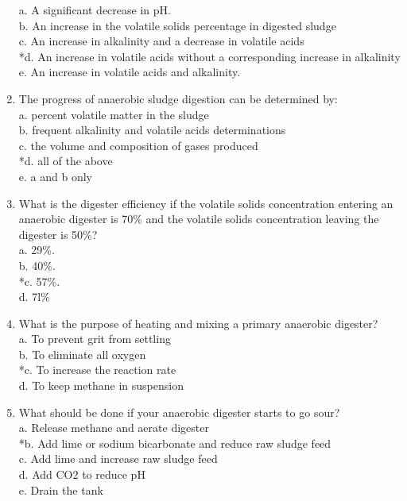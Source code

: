 \documentclass{article}
\begin{document}
\begin{enumerate}
a. A significant decrease in pH. \\
b. An increase in the volatile solids percentage in digested sludge \\
c. An increase in alkalinity and a decrease in volatile acids \\
*d. An increase in volatile acids without a corresponding increase in alkalinity \\
e. An increase in volatile acids and alkalinity. \\

\item  The progress of anaerobic sludge digestion can be determined by: \\

a. percent volatile matter in the sludge \\
b. frequent alkalinity and volatile acids determinations \\
c. the volume and composition of gases produced \\
*d. all of the above \\
e. a and b only \\

\item  What is the digester efficiency if the volatile solids concentration entering an anaerobic digester is 70\% and the volatile solids concentration leaving the digester is 50\%? \\

a. 29\%. \\
b. 40\%. \\
*c. 57\%. \\
d. 7l\% \\

\item  What is the purpose of heating and mixing a primary anaerobic digester? \\

a. To prevent grit from settling \\
b. To eliminate all oxygen \\
*c. To increase the reaction rate \\
d. To keep methane in suspension \\

\item  What should be done if your anaerobic digester starts to go sour? \\

a. Release methane and aerate digester \\
*b. Add lime or sodium bicarbonate and reduce raw sludge feed \\
c. Add lime and increase raw sludge feed \\
d. Add CO2 to reduce pH \\
e. Drain the tank \\


\end{enumerate}
\end{document}
